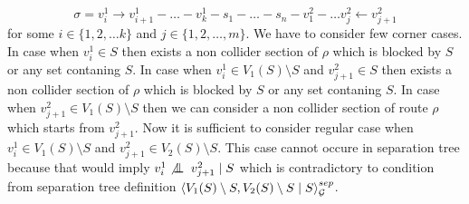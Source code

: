 \begin{prf}
	\begin{equation}
		\sigma = v^1_i \rightarrow v^1_{i+1} - \dots - v^1_k - s_1 - \dots - s_n - v^2_1 - \dots v^2_j \leftarrow v^2_{j+1} 
	\end{equation}
	for some $i \in \{1, 2, \dots k \}$ and $j \in \{ 1, 2, \dots, m\}$. We have to consider few corner cases. 
	In case when $v^1_{i} \in S$ then exists a non collider section of $\rho$ which is blocked by $S$ or any set contaning $S$. 
	In case when $v^1_{i} \in V_1(S) \setminus S$ and $v^2_{j+1} \in S$ then exists a non collider section of $\rho$ which is blocked by $S$ or any set contaning $S$.
	In case when $v^2_{j+1} \in V_1(S) \setminus S$ then we can consider a non collider section of route $\rho$ which starts from $v^2_{j+1}$.
	Now it is sufficient to consider regular case when $v^1_{i} \in V_1(S) \setminus S$ and $v^2_{j+1} \in V_2(S) \setminus S$. This case cannot occure
	in separation tree because that would imply $v^1_{i} \not \bigCI v^2_{j+1} \mid S$ which is contradictory to condition from separation tree definition
	$\left\langle V_1(S) \setminus S , V_2(S) \setminus S \mid S \right\rangle_{\mathcal{G}}^{sep}$. 
	\QED
\end{prf}



